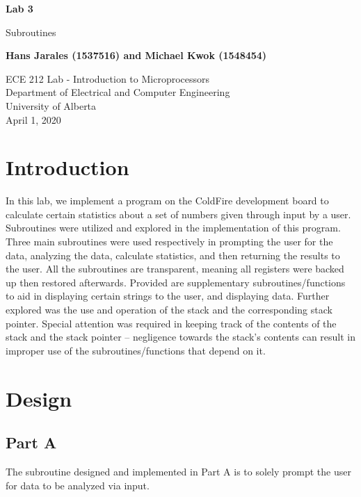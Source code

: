 \documentclass[12pt]{article}
\begin{document}
\begin{titlepage}
    \begin{center}
    \vspace*{1cm}
    
    \textbf{Lab 3}

    \vspace{0.5cm}

     Subroutines
    
    \vspace{1.5cm}

    \textbf{Hans Jarales (1537516) and Michael Kwok (1548454)}

    \vfill
            
    ECE 212 Lab - Introduction to Microprocessors\\
    Department of Electrical and Computer Engineering\\
    University of Alberta\\
    April 1, 2020    

   \end{center}
\end{titlepage}

\tableofcontents
\pagebreak

\section{Introduction}
In this lab, we implement a program on the ColdFire development board to calculate certain statistics about a set of numbers given through input by a user.
Subroutines were utilized and explored in the implementation of this program. Three main subroutines were used respectively in prompting the user for the data, analyzing the data, calculate statistics, and then returning the results to the user. All the subroutines are transparent, meaning all registers were backed up then restored afterwards. Provided are supplementary subroutines/functions to aid in displaying certain strings to the user, and displaying data. Further explored was the use and operation of the stack and the corresponding stack pointer. Special attention was required in keeping track of the contents of the stack and the stack pointer -- negligence towards the stack's contents can result in improper use of the subroutines/functions that depend on it.


\section{Design}
\subsection{Part A}
The subroutine designed and implemented in Part A is to solely prompt the user for data to be analyzed via input.
\end{document}
